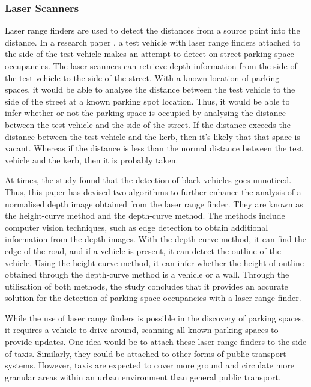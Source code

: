 \subsubsection*{Laser Scanners}
Laser range finders are used to detect the distances from a source point into the distance. In a research paper \citep{ono_probe_2002}, a test vehicle with laser range finders attached to the side of the test vehicle makes an attempt to detect on-street parking space occupancies. The laser scanners can retrieve depth information from the side of the test vehicle to the side of the street. With a known location of parking spaces, it would be able to analyse the distance between the test vehicle to the side of the street at a known parking spot location. Thus, it would be able to infer whether or not the parking space is occupied by analysing the distance between the test vehicle and the side of the street. If the distance exceeds the distance between the test vehicle and the kerb, then it's likely that that space is vacant. Whereas if the distance is less than the normal distance between the test vehicle and the kerb, then it is probably taken.

At times, the study found that the detection of black vehicles goes unnoticed. Thus, this paper has devised two algorithms to further enhance the analysis of a normalised depth image obtained from the laser range finder. They are known as the height-curve method and the depth-curve method. The methods include computer vision techniques, such as edge detection to obtain additional information from the depth images. With the depth-curve method, it can find the edge of the road, and if a vehicle is present, it can detect the outline of the vehicle. Using the height-curve method, it can infer whether the height of outline obtained through the depth-curve method is a vehicle or a wall. Through the utilisation of both methods, the study concludes that it provides an accurate solution for the detection of parking space occupancies with a laser range finder.

While the use of laser range finders is possible in the discovery of parking spaces, it requires a vehicle to drive around, scanning all known parking spaces to provide updates. One idea would be to attach these laser range-finders to the side of taxis. Similarly, they could be attached to other forms of public transport systems. However, taxis are expected to cover more ground and circulate more granular areas within an urban environment than general public transport.